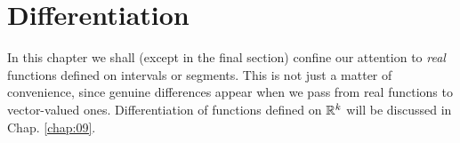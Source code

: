 \chapter{Differentiation}
\label{chap:05}

In this chapter we shall (except in the final section) confine our attention to \emph{real} functions defined on intervals or segments.
This is not just a matter of convenience,
since genuine differences appear when we pass from real functions to vector-valued ones.
Differentiation of functions defined on ${\protect\mathbb R}^{k}$ will be discussed in Chap. \ref{chap:09}.









